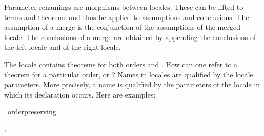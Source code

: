 \begin{isabellebody}
\begin{isamarkuptext}
  Parameter renamings are morphisms between locales.  These can be
  lifted to terms and theorems and thus be applied to assumptions and
  conclusions.  The assumption of a merge is the conjunction of the
  assumptions of the merged locale.  The conclusions of a merge are
  obtained by appending the conclusions of the left locale and of the
  right locale.%
\end{isamarkuptext}%
\isamarkuptrue%
%
\begin{isamarkuptext}%
The locale  contains theorems for both
  orders \isa{{\isasymsqsubseteq}} and \isa{{\isasympreceq}}.  How can one refer to a theorem for
  a particular order, \isa{{\isasymsqsubseteq}} or \isa{{\isasympreceq}}?  Names in locales are
  qualified by the locale parameters.  More precisely, a name is
  qualified by the parameters of the locale in which its declaration
  occurs.  Here are examples:%
\end{isamarkuptext}%
\isamarkuptrue%
%
\isadeliminvisible
%
\endisadeliminvisible
%
\isataginvisible
{}\isamarkupfalse%
\ order{\isacharunderscore}preserving\ %
\endisataginvisible
{\isafoldinvisible}%
%
\isadeliminvisible
%
\endisadeliminvisible
%
\begin{isamarkuptext}%
: 


\end{isamarkuptext}
\end{isabellebody}
